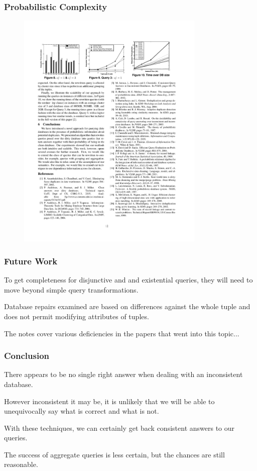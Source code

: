 \begin{frame}
\frametitle{Probabilistic Complexity}

\begin{figure}[!h]
  \centering \includegraphics[width=0.8\textwidth]{images/CAPerformance.pdf}
\end{figure}


\end{frame}


\begin{frame}
\frametitle{Future Work}

To get completeness for disjunctive and and existential queries, they will need to move beyond simple query transformations.

Database repairs examined are based on differences against the whole tuple and does not permit modifying attributes of tuples.

The notes cover various deficiencies in the papers that went into this topic...

\end{frame}


\begin{frame}
\frametitle{Conclusion}

There appears to be no single right answer when dealing with an inconsistent database. 

However inconsistent it may be, it is unlikely that we will be able to unequivocally say what is correct and what is not. 

With these techniques, we can certainly get back consistent answers to our queries. 

The success of aggregate queries is less certain, but the chances are still reasonable.


\end{frame}









